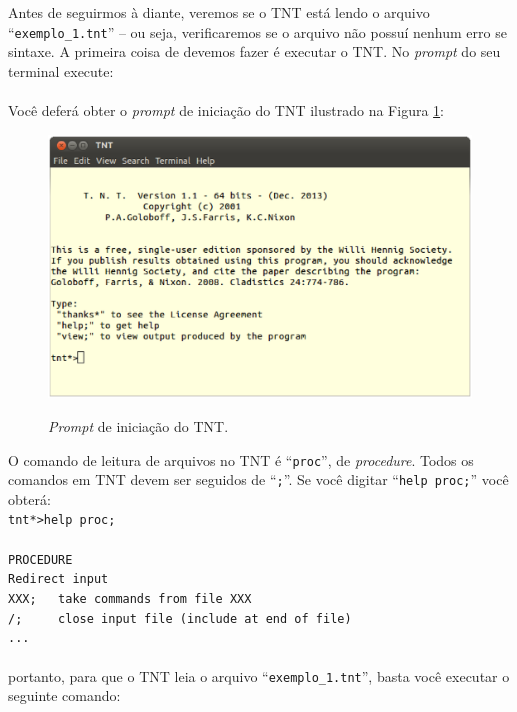 \begin{refsection}
Antes de seguirmos à diante, veremos se o TNT está lendo o arquivo ``\texttt{exemplo\_1.tnt}'' -- ou seja, verificaremos se o arquivo não possuí nenhum erro se sintaxe. A primeira coisa de devemos fazer é executar o TNT. No \textit{prompt} do seu terminal execute:\\
\indent\indent\indent{}\\

Você deferá obter o \textit{prompt} de iniciação do TNT ilustrado na Figura \ref{tut4:fig:tnt1}:\\

  \begin{figure}[H]
      {\includegraphics[scale=0.60]{figures/tut4/tnt_1.eps}}
      {\caption[\textit{\textit{Prompt de TNT} }]{\textit{Prompt} de iniciação do TNT.}\label{tut4:fig:tnt1}}
  \end{figure}


O comando de leitura de arquivos no TNT é ``\texttt{proc}'', de \textit{procedure}. Todos os comandos em TNT devem ser seguidos de ``\texttt{;}''. Se você digitar ``\texttt{help proc;}'' você obterá:
\\
\indent\indent\texttt{tnt*>help proc;}\\
\\
\indent\indent\texttt{PROCEDURE}\\
\indent\indent\indent\texttt{Redirect input }\\
\indent\indent\indent\texttt{XXX;~~~take commands from file XXX }\\
\indent\indent\indent\texttt{/;~~~~~close input file (include at end of file) }\\
\indent\indent\indent\texttt{...}\\
\\
portanto, para que o TNT leia o arquivo ``\texttt{exemplo\_1.tnt}'', basta você executar o seguinte comando:\\


\end{refsection}
